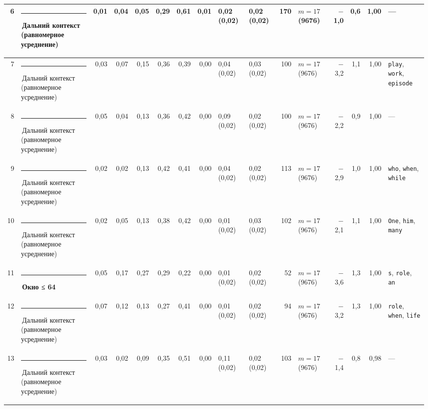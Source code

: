 \documentclass[10pt]{article}
\begin{document}
\begin{minipage}{\linewidth}
\begin{center}
{\begin{tabular}{|r|l|r|r|r|r|r|r|l|l|r|l|r|r|r|l|}
6 & \textcolor[HTML]{C3C2B7}{\rule{0.62em}{0.62em}}\,Дальний контекст (равномерное усреднение) & 0,01 & 0,04 & 0,05 & 0,29 & 0,61 & 0,01 & 0,02 (0,02) & 0,02 (0,02) & 170 & $m{=}17$ (9676) & $-$1,0 & 0,6 & 1,00 & — \\ \hline
7 & \textcolor[HTML]{C3C2B7}{\rule{0.62em}{0.62em}}\,Дальний контекст (равномерное усреднение) & 0,03 & 0,07 & 0,15 & 0,36 & 0,39 & 0,00 & 0,04 (0,02) & 0,03 (0,02) & 100 & $m{=}17$ (9676) & $-$3,2 & 1,1 & 1,00 & \texttt{\textvisiblespace{}play}, \texttt{\textvisiblespace{}work}, \texttt{\textvisiblespace{}episode} \\ \hline
8 & \textcolor[HTML]{C3C2B7}{\rule{0.62em}{0.62em}}\,Дальний контекст (равномерное усреднение) & 0,05 & 0,04 & 0,13 & 0,36 & 0,42 & 0,00 & 0,09 (0,02) & 0,02 (0,02) & 100 & $m{=}17$ (9676) & $-$2,2 & 0,9 & 1,00 & — \\ \hline
9 & \textcolor[HTML]{C3C2B7}{\rule{0.62em}{0.62em}}\,Дальний контекст (равномерное усреднение) & 0,02 & 0,02 & 0,13 & 0,42 & 0,41 & 0,00 & 0,04 (0,02) & 0,02 (0,02) & 113 & $m{=}17$ (9676) & $-$2,9 & 1,0 & 1,00 & \texttt{\textvisiblespace{}who}, \texttt{\textvisiblespace{}when}, \texttt{\textvisiblespace{}while} \\ \hline
10 & \textcolor[HTML]{C3C2B7}{\rule{0.62em}{0.62em}}\,Дальний контекст (равномерное усреднение) & 0,02 & 0,05 & 0,13 & 0,38 & 0,42 & 0,00 & 0,01 (0,02) & 0,03 (0,02) & 102 & $m{=}17$ (9676) & $-$2,1 & 1,1 & 1,00 & \texttt{\textvisiblespace{}One}, \texttt{\textvisiblespace{}him}, \texttt{\textvisiblespace{}many} \\ \hline
11 & \textcolor[HTML]{EDA100}{\rule{0.62em}{0.62em}}\,\textbf{Окно ≤ 64} & 0,05 & 0,17 & 0,27 & 0,29 & 0,22 & 0,00 & 0,01 (0,02) & 0,02 (0,02) & 52 & $m{=}17$ (9676) & $-$3,6 & 1,3 & 1,00 & \texttt{s}, \texttt{\textvisiblespace{}role}, \texttt{an} \\ \hline
12 & \textcolor[HTML]{C3C2B7}{\rule{0.62em}{0.62em}}\,Дальний контекст (равномерное усреднение) & 0,07 & 0,12 & 0,13 & 0,27 & 0,41 & 0,00 & 0,01 (0,02) & 0,02 (0,02) & 94 & $m{=}17$ (9676) & $-$3,2 & 1,3 & 1,00 & \texttt{\textvisiblespace{}role}, \texttt{\textvisiblespace{}when}, \texttt{\textvisiblespace{}life} \\ \hline
13 & \textcolor[HTML]{C3C2B7}{\rule{0.62em}{0.62em}}\,Дальний контекст (равномерное усреднение) & 0,03 & 0,02 & 0,09 & 0,35 & 0,51 & 0,00 & 0,11 (0,02) & 0,02 (0,02) & 103 & $m{=}17$ (9676) & $-$1,4 & 0,8 & 0,98 & — \\ \hline
\hline\end{tabular}}\end{center}
\end{minipage}
\end{document}
